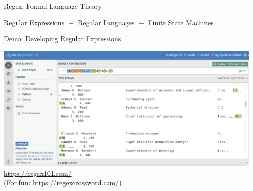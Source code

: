 \documentclass[10pt]{beamer}
\begin{document}
\begin{frame}{Regex: Formal Language Theory}
  \begin{center}
  \end{center}
  \alert{Regular Expressions} $\equiv$ \alert{Regular Languages} $\equiv$ \alert{Finite State Machines}
\end{frame}

\begin{frame}[fragile]{Demo: Developing Regular Expressions}

\begin{center}
  \includegraphics[scale=0.25]{figures/regex101-screenshot.png}
  \\ \vspace{1em}
  \textcolor{blue}{\url{https://regex101.com/}}
  \\
  (For fun: \textcolor{blue}{\url{https://regexcrossword.com/}})
\end{center}

\end{frame}
\end{document}
